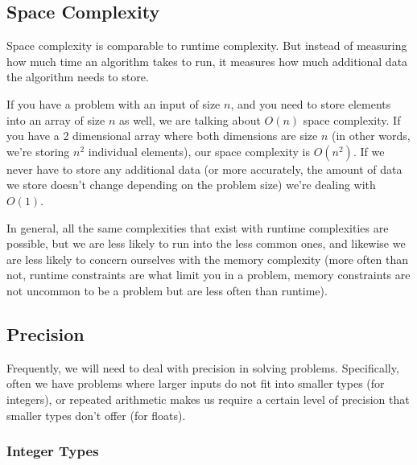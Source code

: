 \subsection{Space Complexity}

Space complexity is comparable to runtime complexity. But instead of measuring how much time an algorithm takes to run, it measures how much additional data the algorithm needs to store.

If you have a problem with an input of size $n$, and you need to store elements into an array of size $n$ as well, we are talking about $O(n)$ space complexity. If you have a 2 dimensional array where both dimensions are size $n$ (in other words, we're storing $n^2$ individual elements), our space complexity is $O(n^2)$. If we never have to store any additional data (or more accurately, the amount of data we store doesn't change depending on the problem size) we're dealing with $O(1)$.

In general, all the same complexities that exist with runtime complexities are possible, but we are less likely to run into the less common ones, and likewise we are less likely to concern ourselves with the memory complexity (more often than not, runtime constraints are what limit you in a problem, memory constraints are not uncommon to be a problem but are less often than runtime).

\subsection{Precision}

Frequently, we will need to deal with precision in solving problems. Specifically, often we have problems where larger inputs do not fit into smaller types (for integers), or repeated arithmetic makes us require a certain level of precision that smaller types don't offer (for floats).

\subsubsection{Integer Types}

